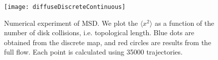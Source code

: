 

\begin{figure}
\texttt{[image: diffuseDiscreteContinuous]}
\caption{Numerical experiment of MSD.  We plot the $\langle
x^2\rangle$ as a function of the number of disk collisions, i.e.
topological length. Blue dots are obtained from the discrete
map, and red circles are results from the full flow. Each point
is calculated using 35000 trajectories.}
\label{fig-disvscont}
\end{figure}
